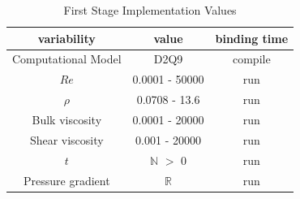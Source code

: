\documentclass[12pt]{article}
\begin{document}
\begin{table}[!h]
\begin{center}
\begin{tabular}{| c | c | c |}
\hline
\textbf{variability} & \textbf{value} & \textbf{binding time}\\
\hline
Computational Model & D2Q9 & compile \\
\hline
$Re$& 0.0001 - 50000 & run\\
\hline
$\rho$ & 0.0708 - 13.6 & run\\
\hline
Bulk viscosity & 0.0001 - 20000 & run\\
\hline
Shear viscosity & 0.001 - 20000 & run\\
\hline
$t$ & $\mathbb{N}$ $>$ 0 & run\\
\hline
Pressure gradient & $\mathbb{R}$ & run\\
\hline
\end{tabular}
\caption{First Stage Implementation Values}
\label{table:fstagevar}
\end{center}
\end{table}
\end{document}
